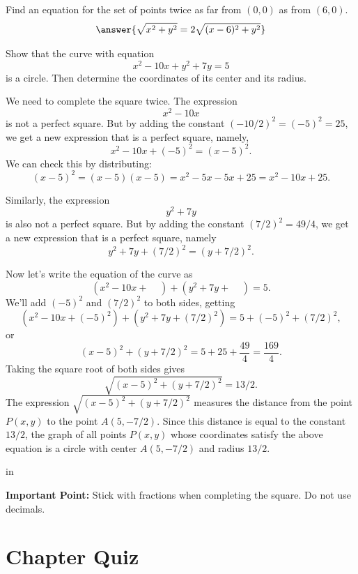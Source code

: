 \documentclass{ximera}
\newcommand{\pskip}{\vskip 0.1 in}
\begin{document}
\begin{question} 
Find an equation for the set of points twice as far from $(0,0)$ as from $(6,0)$. 
\[
  \answer{\sqrt{x^2+y^2} = 2 \sqrt{(x-6)^2+y^2}} 
\]
    \end{question}




\begin{example}   \label{E:348543534}
Show that the curve with equation
\[
   x^2  - 10x + y^2 + 7y = 5
\]
is a circle. Then determine the coordinates of its center and its radius.
\end{example}


\begin{explanation}
We need to complete the square twice. The expression
\[
     x^2 - 10x
\]
is not a perfect square. But by adding the constant $(-10/2)^2 = (-5)^2 = 25$, we get a new expression that is a perfect square, namely,
\[
     x^2 -10x + (-5)^2 = (x-5)^2 .
\]
We can check this by distributing:
\[
    (x-5)^2 = (x-5)(x-5) = x^2 -5x -5x + 25 = x^2 - 10x + 25 .
\]

Similarly, the expression
\[
   y^2 + 7y
\]
is also not a perfect square. But by adding the constant $(7/2)^2 = 49/4$, we get a new expression that is a perfect square, namely
\[
     y^2 + 7y + (7/2)^2 = (y+7/2)^2 .
\]

Now let's write the equation of the curve as
\[
     (x^2  - 10x + \;\;\;\; ) + (y^2 + 7y + \;\;\;\; ) = 5 .
\]
We'll add $(-5)^2$ and $(7/2)^2$ to both sides, getting
\[
     (x^2  - 10x + (-5)^2 ) + (y^2 + 7y + (7/2)^2 ) = 5 + (-5)^2 + (7/2)^2 ,
\]
or
\[
    (x-5)^2 + (y+7/2)^2 = 5 + 25 + \frac{49}{4} = \frac{169}{4} .
\]
Taking the square root of both sides gives
\[
    \sqrt{(x-5)^2 + (y+7/2)^2} = 13/2 .
\]
The expression $\sqrt{(x-5)^2 + (y+7/2)^2}$ measures the distance from the point $P(x,y)$ to the point $A(5,-7/2)$. Since this distance is equal to the constant $13/2$, the graph of all points $P(x,y)$ whose coordinates satisfy the above equation is a circle with center $A(5,-7/2)$ and radius $13/2$.

\pskip 

{\bf Important Point:} Stick with fractions when completing the square. Do not use decimals.

\end{explanation}


\section*{Chapter Quiz}
\end{document}
